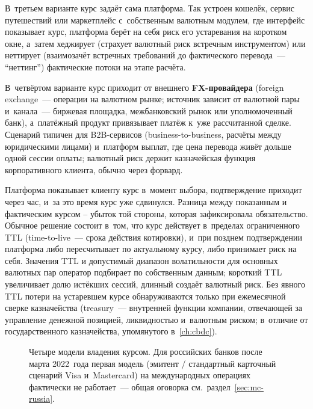 В~третьем варианте курс задаёт сама платформа. Так устроен
кошелёк, сервис путешествий или маркетплейс с~собственным
валютным модулем, где интерфейс показывает курс, платформа берёт
на себя риск его устаревания на коротком окне, а~затем
хеджирует (страхует валютный риск встречным инструментом)
или неттирует (взаимозачёт встречных требований до фактического
перевода~--- \enquote{неттинг}) фактические потоки на этапе расчёта.

В~четвёртом варианте курс приходит от внешнего \textbf{FX-провайдера}
(foreign exchange~--- операции на валютном рынке; источник зависит
от валютной пары и~канала~--- биржевая площадка, межбанковский рынок
или уполномоченный банк), а~платёжный продукт привязывает
платёж к~уже рассчитанной сделке.
Сценарий типичен для B2B-сервисов (business-to-business, расчёты
между юридическими лицами) и~платформ выплат, где цена перевода
живёт дольше одной сессии оплаты; валютный риск держит казначейская
функция корпоративного клиента, обычно через форвард.

Платформа показывает клиенту курс в~момент выбора, подтверждение
приходит через час, и~за это время курс уже сдвинулся. Разница
между показанным и фактическим курсом -- убыток той стороны,
которая зафиксировала обязательство. Обычное решение состоит в~том,
что курс действует в~пределах ограниченного TTL (time-to-live~---
срока действия котировки), и~при позднем
подтверждении платформа либо пересчитывает по актуальному курсу,
либо принимает риск на себя. Значения TTL и допустимый диапазон
волатильности для основных валютных пар оператор подбирает
по собственным данным; короткий TTL увеличивает долю
истёкших сессий, длинный создаёт валютный риск. Без явного
TTL потери на устаревшем курсе обнаруживаются только
при ежемесячной сверке казначейства (treasury~--- внутренней функции
компании, отвечающей за управление денежной позицией, ликвидностью
и~валютным риском; в~отличие от государственного казначейства, упомянутого
в~\autoref{ch:cbdc}).

\begin{figure}[tbp]
  \centering
  \caption{Четыре модели владения курсом. Для российских банков
    после марта 2022~года первая модель (эмитент / стандартный
    карточный сценарий Visa и~Mastercard) на международных операциях
    фактически не работает~--- общая оговорка
    см.\ раздел~\ref{sec:mc-russia}.}\label{fig:fx-ownership-models}
\end{figure}

